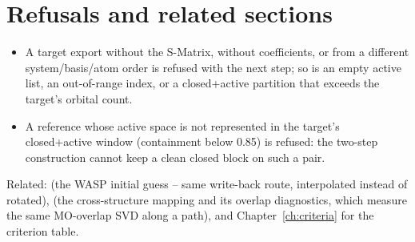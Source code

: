 \section{Refusals and related sections}

\begin{refusalbox}
\begin{itemize}
  \item A target export without the S-Matrix, without coefficients, or
    from a different system/basis/atom order is refused with the next
    step; so is an empty active list, an out-of-range index, or a
    closed+active partition that exceeds the target's orbital count.
  \item A reference whose active space is not represented in the target's
    closed+active window (containment below 0.85) is refused: the
    two-step construction cannot keep a clean closed block on such a pair.
\end{itemize}
\end{refusalbox}

Related:  (the WASP initial guess -- same write-back route,
interpolated instead of rotated),  (the cross-structure mapping
and its overlap diagnostics, which measure the same MO-overlap SVD along a
path), and Chapter~\ref{ch:criteria} for the criterion table.
